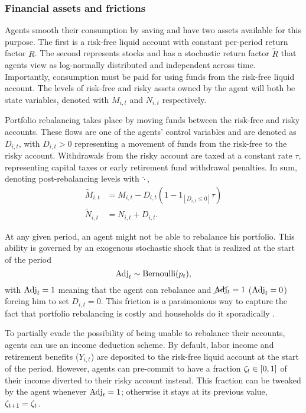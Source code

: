\documentclass[./RiskyContrib.tex]{subfiles}
\begin{document}
\subsubsection{Financial assets and frictions}\label{sec:fin_frictions}

Agents smooth their consumption by saving and have two assets
available for this purpose. The first is a risk-free liquid account with 
constant per-period return factor $R$. The second represents stocks
and has a stochastic return factor $\tilde{R}$ that agents view as 
log-normally distributed and independent across time. Importantly,
consumption must be paid for using funds from the risk-free liquid account.
The levels of risk-free and risky assets owned by the agent will both be state
variables, denoted with $M_{i,t}$ and $N_{i,t}$ respectively.

Portfolio rebalancing takes place by moving funds between the risk-free
and risky accounts. These flows are one of the agents' control variables
and are denoted as $D_{i,t}$, with $D_{i,t}>0$ representing a movement of
funds from the risk-free to the risky account. Withdrawals from the risky
account are taxed at a constant rate $\tau$, representing capital taxes or
early retirement fund withdrawal penalties. In sum, denoting post-rebalancing
levels with
$\tilde{\cdot}$,
\begin{equation*}
\begin{split}
\tilde{M}_{i,t} &= M_{i,t} - D_{i,t}(1 - 1_{[D_{i,t}\leq0]}\tau)\\
\tilde{N}_{i,t} &= N_{i,t} + D_{i,t}.
\end{split}
\end{equation*}

At any given period, an agent might not be able to rebalance his portfolio.
This ability is governed by an exogenous stochastic shock that is realized
at the start of the period
\begin{equation*}
\text{Adj}_t \sim \text{Bernoulli}(p_t),
\end{equation*}
with $\text{Adj}_t=1$ meaning that the agent can rebalance and $\cancel{\text{Adj}}_t=1$ ($\text{Adj}_t = 0$)
forcing him to set $D_{i,t} = 0$. This friction is a parsimonious way to capture
the fact that portfolio rebalancing is costly and households do it sporadically
\cite{Giglio2019nber}.

To partially evade the possibility of being unable to rebalance their accounts, agents
can use an income deduction scheme. By default, labor income and retirement
benefits ($Y_{i,t}$) are deposited to the risk-free liquid account at the start
of the period. However, agents can pre-commit to have a fraction  $\zeta_t\in[0,1]$
of their income diverted to their risky account instead. This fraction can be
tweaked by the agent whenever $\text{Adj}_t = 1$; otherwise it stays at its
previous value, $\zeta_{t+1} = \zeta_t$.
\end{document}
